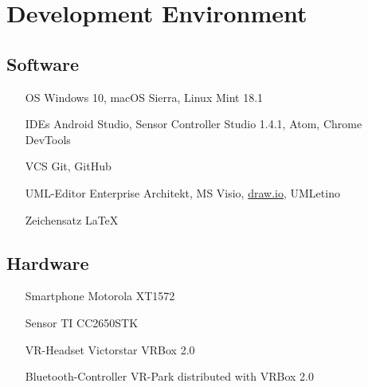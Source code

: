 \section{Development Environment}

\subsection{Software}

\begin{itemize}
  \item[OS] Windows 10, macOS Sierra, Linux Mint 18.1
  \item[IDEs]  Android Studio, Sensor Controller Studio 1.4.1, Atom, Chrome DevTools
  \item[VCS] Git, GitHub
  \item[UML-Editor] Enterprise Architekt, MS Visio, \href{draw.io}{draw.io}, UMLetino
  \item[Zeichensatz] \LaTeX

\end{itemize}

\subsection{Hardware}

\begin{itemize}
  \item[Smartphone] Motorola XT1572
  \item[Sensor] TI CC2650STK
  \item[VR-Headset] Victorstar VRBox 2.0
  \item[Bluetooth-Controller] VR-Park distributed with VRBox 2.0
\end{itemize}
